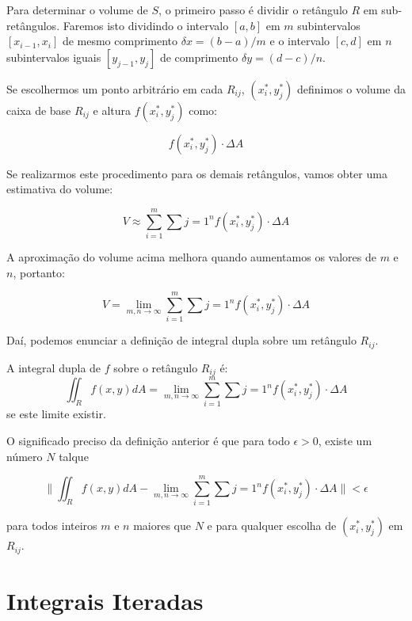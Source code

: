 Para determinar o volume de $S$, o primeiro passo é dividir o retângulo $R$ em sub-retângulos. Faremos isto dividindo o intervalo $[a,b]$ em $m$ subintervalos $[x_{i-1}, x_{i}]$ de mesmo comprimento $\delta x = (b-a)/m$ e o intervalo $[c,d]$ em $n$ subintervalos iguais $[y_{j-1}, y_{j}]$ de comprimento $\delta y = (d-c)/n$.

\begin{figure}[!h]
 \centering
 
\end{figure}

Se escolhermos um ponto arbitrário em cada $R_{ij}$, $(x_i^*, y_j^*)$ definimos o volume da caixa de base $R_{ij}$ e altura $f(x_i^*, y_j^*)$ como:

$$ f(x_i^*, y_j^*) \cdot \Delta A $$

Se realizarmos este procedimento para os demais retângulos, vamos obter uma estimativa do volume:

$$ V \approx \sum_{i=1}^m \sum{j=1}^n f(x_i^*, y_j^*) \cdot \Delta A $$

A aproximação do volume acima melhora quando aumentamos os valores de $m$ e $n$, portanto:

$$ V = \lim_{m,n \rightarrow \infty} \sum_{i=1}^m \sum{j=1}^n f(x_i^*, y_j^*) \cdot \Delta A $$

Daí, podemos enunciar a definição de integral dupla sobre um retângulo $R_{ij}$.

\begin{definition}
 A integral dupla de $f$ sobre o retângulo $R_{ij}$ é:
 \begin{equation}
  \iint _{R} f(x,y) dA = \lim_{m,n \rightarrow \infty} \sum_{i=1}^m \sum{j=1}^n f(x_i^*, y_j^*) \cdot \Delta A
 \end{equation}
 se este limite existir.
\end{definition}

O significado preciso da definição anterior é que para todo $\epsilon > 0$, existe um número $N$ talque

$$ \| \iint _{R} f(x,y) dA -  \lim_{m,n \rightarrow \infty} \sum_{i=1}^m \sum{j=1}^n f(x_i^*, y_j^*) \cdot \Delta A \| < \epsilon $$

para todos inteiros $m$ e $n$ maiores que $N$ e para qualquer escolha de $(x_i^*, y_j^*)$ em $R_{ij}$.

\section{Integrais Iteradas}

